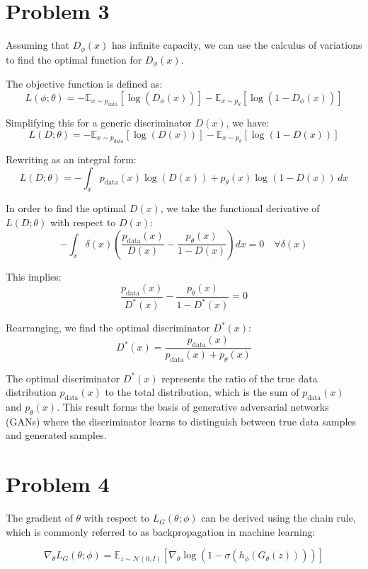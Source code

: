 \documentclass{article}
\begin{document}
\section*{Problem 3}
Assuming that \( D_{\phi}(x) \) has infinite capacity, we can use the calculus of variations to find the optimal function for \( D_{\phi}(x) \).

The objective function is defined as:
\[
L(\phi; \theta) = -\mathbb{E}_{x \sim p_{\text{data}}} [\log(D_{\phi}(x))] - \mathbb{E}_{x \sim p_{\theta}} [\log(1 - D_{\phi}(x))]
\]

Simplifying this for a generic discriminator \( D(x) \), we have:
\[
L(D; \theta) = -\mathbb{E}_{x \sim p_{\text{data}}} [\log(D(x))] - \mathbb{E}_{x \sim p_{\theta}} [\log(1 - D(x))]
\]

Rewriting as an integral form:
\[
L(D; \theta) = -\int_{x} p_{\text{data}}(x) \log(D(x)) + p_{\theta}(x) \log(1 - D(x)) \, dx
\]

In order to find the optimal \( D(x) \), we take the functional derivative of \( L(D; \theta) \) with respect to \( D(x) \):
\[
-\int_{x} \delta(x) \left( \frac{p_{\text{data}}(x)}{D(x)} - \frac{p_{\theta}(x)}{1 - D(x)} \right) dx = 0 \quad \forall \delta(x)
\]

This implies:
\[
\frac{p_{\text{data}}(x)}{D^{*}(x)} - \frac{p_{\theta}(x)}{1 - D^{*}(x)} = 0
\]

Rearranging, we find the optimal discriminator \( D^{*}(x) \):
\[
D^{*}(x) = \frac{p_{\text{data}}(x)}{p_{\text{data}}(x) + p_{\theta}(x)}
\]

The optimal discriminator \( D^{*}(x) \) represents the ratio of the true data distribution \( p_{\text{data}}(x) \) to the total distribution, which is the sum of \( p_{\text{data}}(x) \) and \( p_{\theta}(x) \). This result forms the basis of generative adversarial networks (GANs) where the discriminator learns to distinguish between true data samples and generated samples.
\section*{Problem 4}

The gradient of \( \theta \) with respect to \( L_G(\theta; \phi) \) can be derived using the chain rule, which is commonly referred to as backpropagation in machine learning:

\[
\nabla_{\theta} L_G(\theta; \phi) = \mathbb{E}_{z \sim \mathcal{N}(0, I)} \left[ \nabla_{\theta} \log(1 - \sigma(h_{\phi}(G_{\theta}(z)))) \right]
\]
\end{document}
